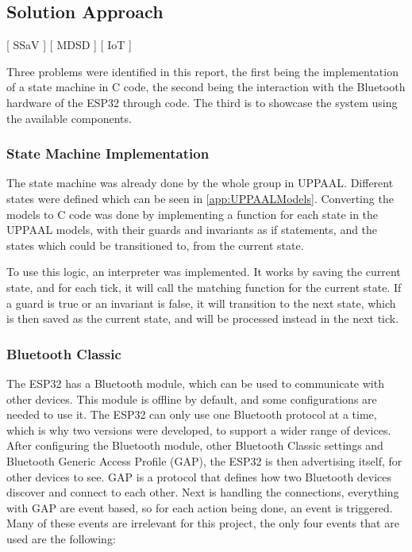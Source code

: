 \subsection{Solution Approach}
[ SSaV ] [ MDSD ] [ IoT ] 
\newline

Three problems were identified in this report, the first being the implementation of a state machine in C code, the second being the interaction with the Bluetooth hardware of the ESP32 through code.
The third is to showcase the system using the available components.

\subsubsection{State Machine Implementation}
The state machine was already done by the whole group in UPPAAL.
Different states were defined which can be seen in \ref{app:UPPAALModels}.
Converting the models to C code was done by implementing a function for each state in the UPPAAL models, with their guards and invariants as if statements, and the states which could be transitioned to, from the current state.

To use this logic, an interpreter was implemented.
It works by saving the current state, and for each tick, it will call the matching function for the current state.
If a guard is true or an invariant is false, it will transition to the next state, which is then saved as the current state, and will be processed instead in the next tick.

\subsubsection{Bluetooth Classic}
The ESP32 has a Bluetooth module, which can be used to communicate with other devices.
This module is offline by default, and some configurations are needed to use it.
The ESP32 can only use one Bluetooth protocol at a time, which is why two versions were developed, to support a wider range of devices.
After configuring the Bluetooth module, other Bluetooth Classic settings and Bluetooth Generic Access Profile (GAP), the ESP32 is then advertising itself, for other devices to see.
GAP is a protocol that defines how two Bluetooth devices discover and connect to each other.
Next is handling the connections, everything with GAP are event based, so for each action being done, an event is triggered.
Many of these events are irrelevant for this project, the only four events that are used are the following:
\newline

